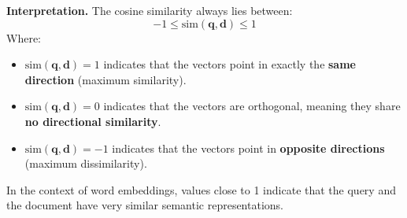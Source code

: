 \begin{definitionbox}
    \highspace
    \textcolor{Green3}{ \textbf{Interpretation.}} The cosine similarity always lies between:
    \begin{equation*}
        -1 \leq \mathrm{sim}\left(\mathbf{q}, \mathbf{d}\right) \leq 1
    \end{equation*}
    Where:
    \begin{itemize}
        \item $\mathrm{sim}\left(\mathbf{q}, \mathbf{d}\right) = 1$ indicates that the vectors point in exactly the \textbf{same direction} (maximum similarity).
        \item $\mathrm{sim}\left(\mathbf{q}, \mathbf{d}\right) = 0$ indicates that the vectors are orthogonal, meaning they share \textbf{no directional similarity}.
        \item $\mathrm{sim}\left(\mathbf{q}, \mathbf{d}\right) = -1$ indicates that the vectors point in \textbf{opposite directions} (maximum dissimilarity).
    \end{itemize}
    In the context of word embeddings, values close to 1 indicate that the query and the document have very similar semantic representations.
    \begin{center}
\end{center}
\end{definitionbox}
